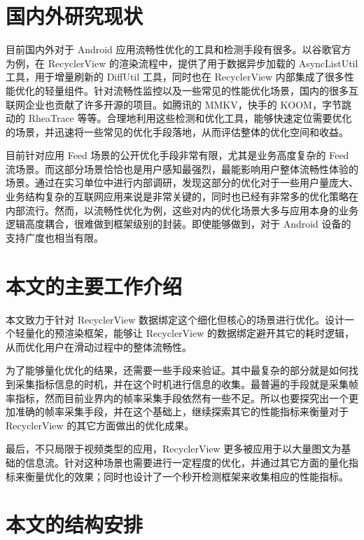 \section{国内外研究现状}

目前国内外对于 Android 应用流畅性优化的工具和检测手段有很多。以谷歌官方为例，在 RecyclerView 的渲染流程中，提供了用于数据异步加载的 AsyncListUtil 工具，用于增量刷新的 DiffUtil 工具，同时也在 RecyclerView 内部集成了很多性能优化的轻量组件。针对流畅性监控以及一些常见的性能优化场景，国内的很多互联网企业也贡献了许多开源的项目。如腾讯的 MMKV，快手的 KOOM，字节跳动的 RheaTrace 等等。合理地利用这些检测和优化工具，能够快速定位需要优化的场景，并迅速将一些常见的优化手段落地，从而评估整体的优化空间和收益。

目前针对应用 Feed 场景的公开优化手段非常有限，尤其是业务高度复杂的 Feed 流场景。而这部分场景恰恰也是用户感知最强烈，最能影响用户整体流畅性体验的场景。通过在实习单位中进行内部调研，发现这部分的优化对于一些用户量庞大、业务结构复杂的互联网应用来说是非常关键的，同时也已经有非常多的优化策略在内部流行。然而，以流畅性优化为例，这些对内的优化场景大多与应用本身的业务逻辑高度耦合，很难做到框架级别的封装。即使能够做到，对于 Android 设备的支持广度也相当有限。

\section{本文的主要工作介绍}

本文致力于针对 RecyclerView 数据绑定这个细化但核心的场景进行优化。设计一个轻量化的预渲染框架，能够让 RecyclerView 的数据绑定避开其它的耗时逻辑，从而优化用户在滑动过程中的整体流畅性。

为了能够量化优化的结果，还需要一些手段来验证。其中最复杂的部分就是如何找到采集指标信息的时机，并在这个时机进行信息的收集。最普遍的手段就是采集帧率指标，然而目前业界内的帧率采集手段依然有一些不足。所以也要探究出一个更加准确的帧率采集手段，并在这个基础上，继续探索其它的性能指标来衡量对于 RecyclerView 的其它方面做出的优化成果。

最后，不只局限于视频类型的应用，RecyclerView 更多被应用于以大量图文为基础的信息流。针对这种场景也需要进行一定程度的优化，并通过其它方面的量化指标来衡量优化的效果；同时也设计了一个秒开检测框架来收集相应的性能指标。

\section{本文的结构安排}

